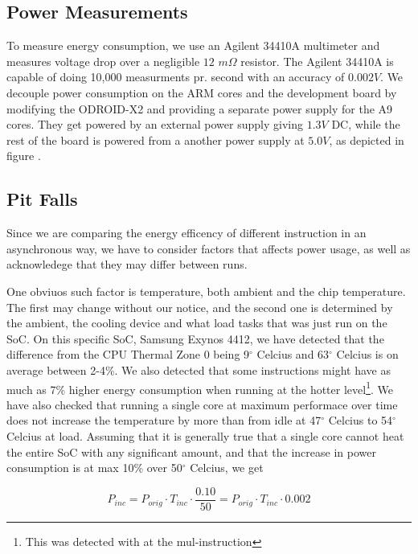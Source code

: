 \subsection{Power Measurements}
To measure energy consumption, we use an Agilent 34410A multimeter and measures
voltage drop over a negligible $12$ $m\Omega$ resistor. The Agilent 34410A is
capable of doing 10,000 measurments pr. second with an accuracy of
$0.002V$\cite{agilent34410a}. We decouple power consumption on the ARM cores
and the development board by modifying the ODROID-X2 and providing a separate
power supply for the A9 cores. They get
powered by an external power supply giving $1.3V$ DC, while the rest of the
board is powered from a another power supply at $5.0V$, as depicted in figure
.

\subsection{Pit Falls}
Since we are comparing the energy efficency of different instruction in an
asynchronous way, we have to consider factors that affects power usage, as well
as acknowledege that they may differ between runs.

One obviuos such factor is temperature, both ambient and the chip temperature.
The first may change without our notice, and the second one is determined by the
ambient, the cooling device and what load tasks that was just run on the SoC. On
this specific SoC, Samsung Exynos 4412, we have detected that the difference
from the CPU Thermal Zone 0 being 9$^\circ$ Celcius and 63$^\circ$ Celcius is on
average between 2-4\%. We also detected that some instructions might have as
much as 7\% higher energy consumption when running at the hotter
level\footnote{This was detected with at the {\ttfamily mul}-instruction}. We
have also checked that running a single core at maximum performace over time
does not increase the temperature by more than from idle at 47$^\circ$ Celcius
to 54$^\circ$ Celcius at load. Assuming that it is generally true that a single
core cannot heat the entire SoC with any significant amount, and that the
increase in power consumption is at max 10\% over 50$^\circ$ Celcius, we get

\begin{equation}
    P_{inc} = P_{orig} \cdot T_{inc} \cdot \frac{0.10}{50} = P_{orig} \cdot T_{inc} \cdot 0.002
\end{equation}

